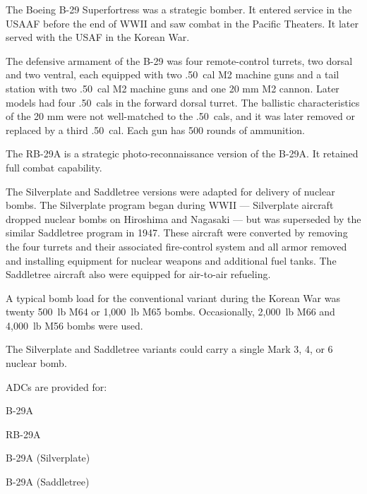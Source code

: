 
The Boeing B-29 Superfortress was a strategic bomber. It entered service in the USAAF before the end of WWII and saw combat in the Pacific Theaters. It later served with the USAF in the Korean War.

The defensive armament of the B-29 was four remote-control turrets, two dorsal and two ventral, each equipped with two .50~cal M2 machine guns and a tail station with two .50~cal M2 machine guns and one 20 mm M2 cannon. Later models had four .50~cals in the forward dorsal turret. The ballistic characteristics of the 20 mm were not well-matched to the .50~cals, and it was later removed or replaced by a third .50~cal. Each gun has 500 rounds of ammunition. 

The RB-29A is a strategic photo-reconnaissance version of the B-29A. It retained full combat capability.

The Silverplate and Saddletree versions were adapted for delivery of nuclear bombs.  The Silverplate program began during WWII --- Silverplate aircraft dropped nuclear bombs on Hiroshima and Nagasaki --- but was superseded by the similar Saddletree program in 1947. These aircraft were converted by removing the four turrets and their associated fire-control system and all armor removed and installing equipment for nuclear weapons and additional fuel tanks. The Saddletree aircraft also were equipped for air-to-air refueling.

A typical bomb load for the conventional variant during the Korean War was twenty 500~lb M64 or 1,000~lb M65 bombs. Occasionally, 2,000~lb M66 and 4,000~lb M56 bombs were used. 

The Silverplate and Saddletree variants could carry a single Mark 3, 4, or 6 nuclear bomb.

ADCs are provided for:
\begin{adclist}
\item B-29A
\item RB-29A
\item B-29A (Silverplate)
\item B-29A (Saddletree)
\end{adclist}
